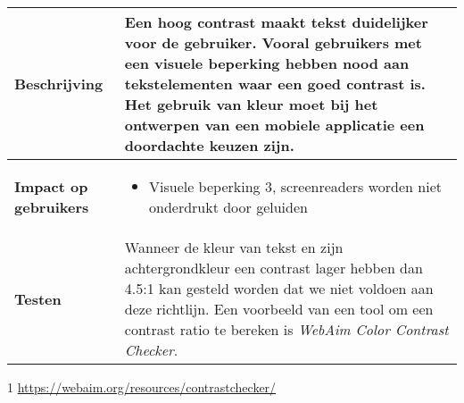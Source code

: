 \begin{table}[H]
\begin{threeparttable}
\begin{tabular}{|l|p{12cm}|}
        \textbf{Beschrijving}                 & Een hoog contrast maakt tekst duidelijker voor de gebruiker. Vooral gebruikers met een visuele beperking hebben nood aan tekstelementen waar een goed contrast is. Het gebruik van kleur moet bij het ontwerpen van een mobiele applicatie een doordachte keuzen zijn. \\ 
        \hline
        \textbf{Impact op gebruikers}         &  
        \begin{itemize}
            \item Visuele beperking 3, screenreaders worden niet onderdrukt door geluiden
        \end{itemize}                                                                                                                                                                                                                                                                                                                                                                                                                    \\ 
        \hline
        \textbf{Testen}                       & Wanneer de kleur van tekst en zijn achtergrondkleur een contrast lager hebben dan 4.5:1 kan gesteld worden dat we niet voldoen aan deze richtlijn. Een voorbeeld van een tool om een contrast ratio te bereken is  \emph{WebAim Color Contrast Checker}\tnote{1}.                                                                                                                                                                                                                                 \\
        \hline
    \end{tabular}
\begin{tablenotes}
    \item[1] \url{https://webaim.org/resources/contrastchecker/}
    
\end{tablenotes}
   \end{threeparttable}
\end{table}


